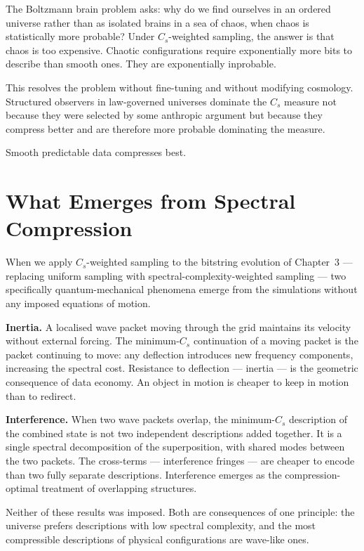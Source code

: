 The Boltzmann brain problem asks: why do we find ourselves in an ordered
universe rather than as isolated brains in a sea of chaos, when chaos is
statistically more probable? Under $C_s$-weighted sampling, the answer
is that chaos is too expensive. Chaotic configurations require
exponentially more bits to describe than smooth ones. They are exponentially
inprobable.

This resolves the problem without fine-tuning and without modifying
cosmology. Structured observers in law-governed universes dominate the
$C_s$ measure not because they were selected by some anthropic argument
but because they compress better and are therefore more probable dominating
the measure.

Smooth predictable data compresses best. 


\section{What Emerges from Spectral Compression}

When we apply $C_s$-weighted sampling to the bitstring evolution of
Chapter~3 --- replacing uniform sampling with spectral-complexity-weighted
sampling --- two specifically quantum-mechanical phenomena emerge from the
simulations without any imposed equations of motion.

\textbf{Inertia.} A localised wave packet moving through the grid
maintains its velocity without external forcing. The minimum-$C_s$
continuation of a moving packet is the packet continuing to move: any
deflection introduces new frequency components, increasing the spectral
cost. Resistance to deflection --- inertia --- is the geometric
consequence of data economy. An object in motion is cheaper to keep in
motion than to redirect.

\textbf{Interference.} When two wave packets overlap, the minimum-$C_s$
description of the combined state is not two independent descriptions
added together. It is a single spectral decomposition of the
superposition, with shared modes between the two packets. The
cross-terms --- interference fringes --- are cheaper to encode than two
fully separate descriptions. Interference emerges as the
compression-optimal treatment of overlapping structures.

Neither of these results was imposed. Both are consequences of one
principle: the universe prefers descriptions with low spectral
complexity, and the most compressible descriptions of physical
configurations are wave-like ones.

